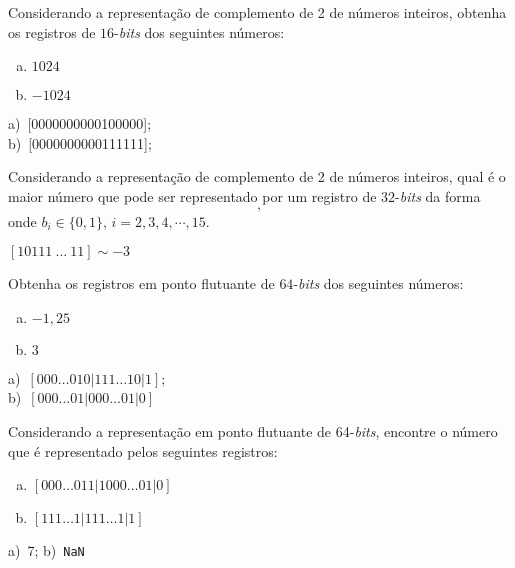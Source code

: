 \begin{exer}
  Considerando a representação de complemento de 2 de números inteiros, obtenha os registros de $16$-{\it bits} dos seguintes números:
  \begin{enumerate}[a)]
  \item $1024$
  \item $-1024$
  \end{enumerate}
\end{exer}
\begin{resp}
    a)~[0000000000100000]; \\
    b)~[0000000000111111];
\end{resp}

\begin{exer}
  Considerando a representação de complemento de 2 de números inteiros, qual é o maior número que pode ser representado por um registro de $32$-{\it bits} da forma
  \begin{equation}
    [1 ~ 0 ~ b_2 ~ b_3 ~ b_4 ~ \cdots ~ b_{30} ~ 1],
  \end{equation}
onde $b_i \in \{0, 1\}$, $i=2, 3, 4, \cdots, 15$.
\end{exer}
\begin{resp}
  $[10111~\ldots~11] \sim -3$
\end{resp}

\begin{exer}
  Obtenha os registros em ponto flutuante de $64$-{\it bits} dos seguintes números:
  \begin{enumerate}[a)]
  \item $-1,25$
  \item $3$
  \end{enumerate}
\end{exer}
\begin{resp}
    a)~$[000\ldots 0 10|111\ldots 10|1]$;\\
    b)~$[000\ldots 01|000\ldots 01|0]$
\end{resp}

\begin{exer}
  Considerando a representação em ponto flutuante de 64-{\it bits}, encontre o número que é representado pelos seguintes registros:
  \begin{enumerate}[a)]
  \item $[000\ldots 011|1000\ldots 01|0]$
  \item $[111\ldots 1|111\ldots 1|1]$
  \end{enumerate}
\end{exer}
\begin{resp}
    a)~7; b)~\verb+NaN+
\end{resp}


